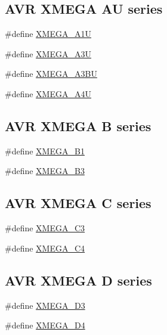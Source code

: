 \subsection*{A\+VR X\+M\+E\+GA AU series}
\begin{DoxyCompactItemize}
\item 
\#define \mbox{\hyperlink{group__xmega__part__macros__group_ga6672329ddee03af905aa378946568b67}{X\+M\+E\+G\+A\+\_\+\+A1U}}
\item 
\#define \mbox{\hyperlink{group__xmega__part__macros__group_gab5232598231cc5c17658e4b7cc5293ec}{X\+M\+E\+G\+A\+\_\+\+A3U}}
\item 
\#define \mbox{\hyperlink{group__xmega__part__macros__group_ga98083f3307fe61cc2377948db87cd708}{X\+M\+E\+G\+A\+\_\+\+A3\+BU}}
\item 
\#define \mbox{\hyperlink{group__xmega__part__macros__group_ga7625edcdd219df905c870d73c1689da6}{X\+M\+E\+G\+A\+\_\+\+A4U}}
\end{DoxyCompactItemize}
\subsection*{A\+VR X\+M\+E\+GA B series}
\begin{DoxyCompactItemize}
\item 
\#define \mbox{\hyperlink{group__xmega__part__macros__group_gaa2fd55860a1bbc05c6d0d384e7476596}{X\+M\+E\+G\+A\+\_\+\+B1}}
\item 
\#define \mbox{\hyperlink{group__xmega__part__macros__group_ga7385be70af05a3a61864a4fc470fa39d}{X\+M\+E\+G\+A\+\_\+\+B3}}
\end{DoxyCompactItemize}
\subsection*{A\+VR X\+M\+E\+GA C series}
\begin{DoxyCompactItemize}
\item 
\#define \mbox{\hyperlink{group__xmega__part__macros__group_ga10c26d10c3df7d9874e4527d1327c60b}{X\+M\+E\+G\+A\+\_\+\+C3}}
\item 
\#define \mbox{\hyperlink{group__xmega__part__macros__group_ga8add217f9d3d28fda40ec91e65a5d970}{X\+M\+E\+G\+A\+\_\+\+C4}}
\end{DoxyCompactItemize}
\subsection*{A\+VR X\+M\+E\+GA D series}
\begin{DoxyCompactItemize}
\item 
\#define \mbox{\hyperlink{group__xmega__part__macros__group_gad634208a506f79622c67be500014feb3}{X\+M\+E\+G\+A\+\_\+\+D3}}
\item 
\#define \mbox{\hyperlink{group__xmega__part__macros__group_ga831e633408c7458a445d333b9b3f142f}{X\+M\+E\+G\+A\+\_\+\+D4}}
\end{DoxyCompactItemize}
